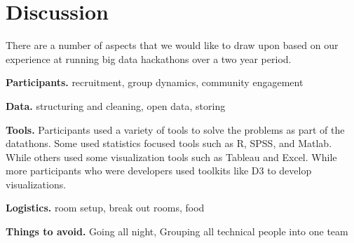 \section{Discussion}

There are a number of aspects that we would like to draw upon based on our experience at running big data hackathons over a two year period.

\textbf{Participants.} recruitment, group dynamics, community engagement

\textbf{Data.} structuring and cleaning, open data, storing

\textbf{Tools.} Participants used a variety of tools to solve the problems as part of the datathons. Some used statistics focused tools such as R, SPSS, and Matlab. While others used some visualization tools such as Tableau and Excel. While more participants who were developers used toolkits like D3 to develop visualizations.

\textbf{Logistics.} room setup, break out rooms, food

\textbf{Things to avoid.} Going all night, Grouping all technical people into one team
